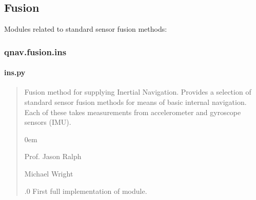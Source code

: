 \documentclass[letterpaper,10pt,english]{sphinxmanual}
\begin{document}
\subsection{Fusion}
\label{\detokenize{usage/packages:fusion}}
\sphinxAtStartPar
Modules related to standard sensor fusion methods:

\sphinxstepscope


\subsubsection{qnav.fusion.ins}
\label{\detokenize{modules/fusion/ins:module-qnav.fusion.ins}}\label{\detokenize{modules/fusion/ins:qnav-fusion-ins}}\label{\detokenize{modules/fusion/ins::doc}}

\paragraph{ins.py}
\label{\detokenize{modules/fusion/ins:ins-py}}\begin{quote}\begin{description}
\sphinxAtStartPar
Fusion method for supplying Inertial Navigation.
Provides a selection of standard sensor fusion methods for means of basic
internal navigation. Each of these takes measurements from accelerometer
and gyroscope sensors (IMU).

\begin{DUlineblock}{0em}
\item[] Prof. Jason Ralph \sphinxhyphen{} 
\item[] Michael Wright \sphinxhyphen{} 
\end{DUlineblock}

.0 \sphinxhyphen{} First full implementation of module.

\end{description}\end{quote}
\end{document}
